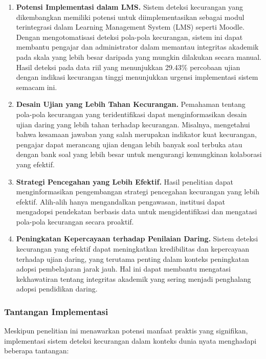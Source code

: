 \begin{enumerate}
    \item \textbf{Potensi Implementasi dalam LMS.} Sistem deteksi kecurangan yang dikembangkan memiliki potensi untuk diimplementasikan sebagai modul terintegrasi dalam Learning Management System (LMS) seperti Moodle. Dengan mengotomatisasi deteksi pola-pola kecurangan, sistem ini dapat membantu pengajar dan administrator dalam memantau integritas akademik pada skala yang lebih besar daripada yang mungkin dilakukan secara manual. Hasil deteksi pada data riil yang menunjukkan 29.43\% percobaan ujian dengan indikasi kecurangan tinggi menunjukkan urgensi implementasi sistem semacam ini.

    \item \textbf{Desain Ujian yang Lebih Tahan Kecurangan.} Pemahaman tentang pola-pola kecurangan yang teridentifikasi dapat menginformasikan desain ujian daring yang lebih tahan terhadap kecurangan. Misalnya, mengetahui bahwa kesamaan jawaban yang salah merupakan indikator kuat kecurangan, pengajar dapat merancang ujian dengan lebih banyak soal terbuka atau dengan bank soal yang lebih besar untuk mengurangi kemungkinan kolaborasi yang efektif.

    \item \textbf{Strategi Pencegahan yang Lebih Efektif.} Hasil penelitian dapat menginformasikan pengembangan strategi pencegahan kecurangan yang lebih efektif. Alih-alih hanya mengandalkan pengawasan, institusi dapat mengadopsi pendekatan berbasis data untuk mengidentifikasi dan mengatasi pola-pola kecurangan secara proaktif.

    \item \textbf{Peningkatan Kepercayaan terhadap Penilaian Daring.} Sistem deteksi kecurangan yang efektif dapat meningkatkan kredibilitas dan kepercayaan terhadap ujian daring, yang terutama penting dalam konteks peningkatan adopsi pembelajaran jarak jauh. Hal ini dapat membantu mengatasi kekhawatiran tentang integritas akademik yang sering menjadi penghalang adopsi pendidikan daring.
\end{enumerate}

\subsubsection{Tantangan Implementasi}

Meskipun penelitian ini menawarkan potensi manfaat praktis yang signifikan, implementasi sistem deteksi kecurangan dalam konteks dunia nyata menghadapi beberapa tantangan:

